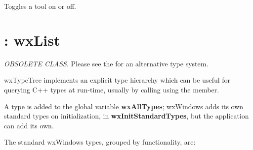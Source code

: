 

Toggles a tool on or off.

\section{: wxList}\label{wxtypetree}

{\it OBSOLETE CLASS}. Please see the \rtfsp
for an alternative type system.

wxTypeTree implements an explicit type hierarchy which can be useful for
querying C++ types at run-time, usually by calling \rtfsp
using the  member.

A type is added to the global variable {\bf wxAllTypes}; wxWindows adds
its own standard types on initialization, in {\bf wxInitStandardTypes},
but the application can add its own.

The standard wxWindows types, grouped by functionality, are:

